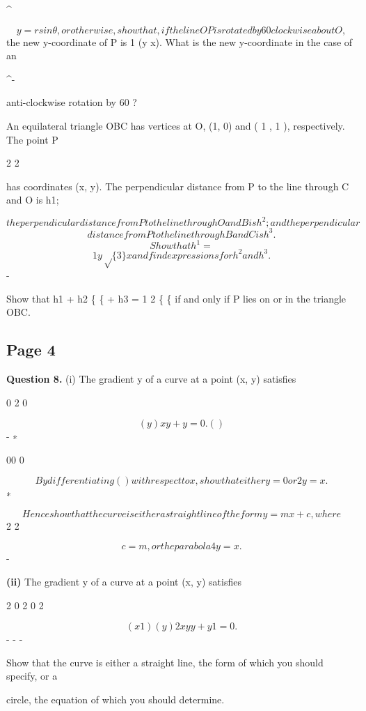 \documentclass[12pt]{article}
\begin{document}
\begin{flushleft}
\textasciicircum{}\circ\par
\[y = r sin θ, or otherwise, show that, if the line OP is rotated by 60 clockwise about O,\]
the new y-coordinate of P is 1 (y  x). What is the new y-coordinate in the case of an\par
\textasciicircum{}\circ -\par
anti-clockwise rotation by 60 ?\par
An equilateral triangle OBC has vertices at O, (1, 0) and ( 1 , 1 ), respectively. The point P\par
2 2\par
has coordinates (x, y). The perpendicular distance from P to the line through C and O is h1;\par
\[the perpendicular distance from P to the line through O and B is h^2; and the perpendicular\]
\[distance from P to the line through B and C is h^3.\]
\[Show that h^1 =\]
\[1 y \sqrt\{3\} x and find expressions for h^2 and h^3.\]
-\par
Show that h1 + h2 \{ \{ + h3 = 1 2 \{ \{  if and only if P lies on or in the triangle OBC.\par
\end{flushleft}
\subsection*{Page 4}
\begin{flushleft}
\bigskip\textbf{Question 8.} (i) The gradient y of a curve at a point (x, y) satisfies\par
0 2 0\par
\[(y ) xy + y = 0 . ( )\]
- ∗\par
00 0\par
\[By differentiating ( ) with respect to x, show that either y = 0 or 2y = x .\]
∗\par
\[Hence show that the curve is either a straight line of the form y = mx + c, where\]
2 2\par
\[c = m , or the parabola 4y = x .\]
-\par
\textbf{(ii)} The gradient y of a curve at a point (x, y) satisfies\par
2 0 2 0 2\par
\[(x 1)(y ) 2xyy + y 1 = 0 .\]
- - -\par
Show that the curve is either a straight line, the form of which you should specify, or a\par
circle, the equation of which you should determine.\par
\end{flushleft}
\end{document}
